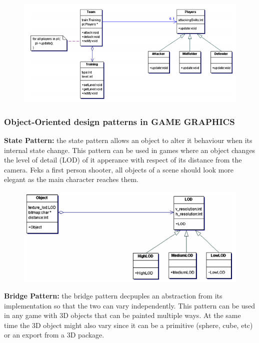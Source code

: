      \begin{figure}[H]
        \includegraphics[width=\textwidth]{pics/observerpattern.png}
      \end{figure}

    \subsubsection*{Object-Oriented design patterns in GAME GRAPHICS}

    {\bf State Pattern:} the state pattern allows an object to alter it behaviour when its internal state change. This pattern can be used in games where an object changes the level of detail (LOD) of it apperance with respect of its distance from the camera. Feks a first person shooter, all objects of a scene should look more elegant as the main character reaches them. 

      \begin{figure}[H]
        \includegraphics[width=\textwidth]{pics/statepattern.png}
      \end{figure}

    {\bf Bridge Pattern:} the bridge pattern decpuples an abstraction from its implementation so that the two can vary independently. This pattern can be used in any game with 3D objects that can be painted multiple ways. At the same time the 3D object might also vary since it can be a primitive (sphere, cube, etc) or an export from a 3D package. 

